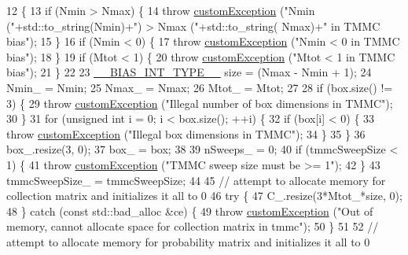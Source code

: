 \begin{DoxyCode}
12                                                                                                            
                       \{
13     \textcolor{keywordflow}{if} (Nmin > Nmax) \{
14         \textcolor{keywordflow}{throw} \hyperlink{classcustom_exception}{customException} (\textcolor{stringliteral}{"Nmin ("}+std::to\_string(Nmin)+\textcolor{stringliteral}{") > Nmax ("}+std::to\_string(
      Nmax)+\textcolor{stringliteral}{" in TMMC bias"});
15     \}
16     \textcolor{keywordflow}{if} (Nmin < 0) \{
17         \textcolor{keywordflow}{throw} \hyperlink{classcustom_exception}{customException} (\textcolor{stringliteral}{"Nmin < 0 in TMMC bias"});
18     \}
19     \textcolor{keywordflow}{if} (Mtot < 1) \{
20         \textcolor{keywordflow}{throw} \hyperlink{classcustom_exception}{customException} (\textcolor{stringliteral}{"Mtot < 1 in TMMC bias"});
21     \}
22 
23     \hyperlink{bias_8h_a1ceb524363fcb94da0c64d297ea27438}{\_\_BIAS\_INT\_TYPE\_\_} size = (Nmax - Nmin + 1);
24     Nmin\_ = Nmin;
25     Nmax\_ = Nmax;
26     Mtot\_ = Mtot;
27 
28     \textcolor{keywordflow}{if} (box.size() != 3) \{
29         \textcolor{keywordflow}{throw} \hyperlink{classcustom_exception}{customException} (\textcolor{stringliteral}{"Illegal number of box dimensions in TMMC"});
30     \}
31     \textcolor{keywordflow}{for} (\textcolor{keywordtype}{unsigned} \textcolor{keywordtype}{int} i = 0; i < box.size(); ++i) \{
32         \textcolor{keywordflow}{if} (box[i] < 0) \{
33             \textcolor{keywordflow}{throw} \hyperlink{classcustom_exception}{customException} (\textcolor{stringliteral}{"Illegal box dimensions in TMMC"});
34         \}
35     \}
36     box\_.resize(3, 0);
37     box\_ = box;
38 
39     nSweeps\_ = 0;
40     \textcolor{keywordflow}{if} (tmmcSweepSize < 1) \{
41         \textcolor{keywordflow}{throw} \hyperlink{classcustom_exception}{customException} (\textcolor{stringliteral}{"TMMC sweep size must be >= 1"});
42     \}
43     tmmcSweepSize\_ = tmmcSweepSize;
44 
45     \textcolor{comment}{// attempt to allocate memory for collection matrix and initializes it all to 0}
46     \textcolor{keywordflow}{try} \{
47         C\_.resize(3*Mtot\_*size, 0);
48     \} \textcolor{keywordflow}{catch} (\textcolor{keyword}{const} std::bad\_alloc &ce) \{
49         \textcolor{keywordflow}{throw} \hyperlink{classcustom_exception}{customException} (\textcolor{stringliteral}{"Out of memory, cannot allocate space for collection matrix
       in tmmc"});
50     \}
51 
52     \textcolor{comment}{// attempt to allocate memory for probability matrix and initializes it all to 0}

\end{DoxyCode}
